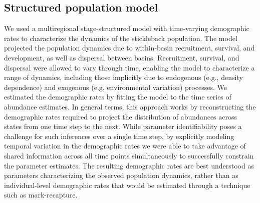 \subsection*{Structured population model} 

We used a multiregional stage-structured model with time-varying demographic rates
to characterize the dynamics of the stickleback population. 
The model projected the population dynamics due to 
within-basin recruitment, survival, and development, 
as well as dispersal between basins. 
Recruitment, survival, and dispersal were allowed to vary through time,
enabling the model to characterize a range of dynamics, 
including those implicitly due to endogenous (e.g., density dependence) 
and exogenous (e.g, environmental variation) processes. 
We estimated the demographic rates by  
fitting the model to the time series of abundance estimates. 
In general terms, this approach works by reconstructing the demographic rates required
to project the distribution of abundances across states from one time step to the next. 
While parameter identifiability poses a challenge for such inferences over a single time
step, by explicitly modeling temporal variation in the demographic rates we were able 
to take advantage of shared information across all time points simultaneously to 
successfully constrain the parameter estimates.
The resulting demographic rates are best understood as parameters 
characterizing the observed population dynamics, 
rather than as individual-level demographic rates that would be estimated through a 
technique such as mark-recapture. 

